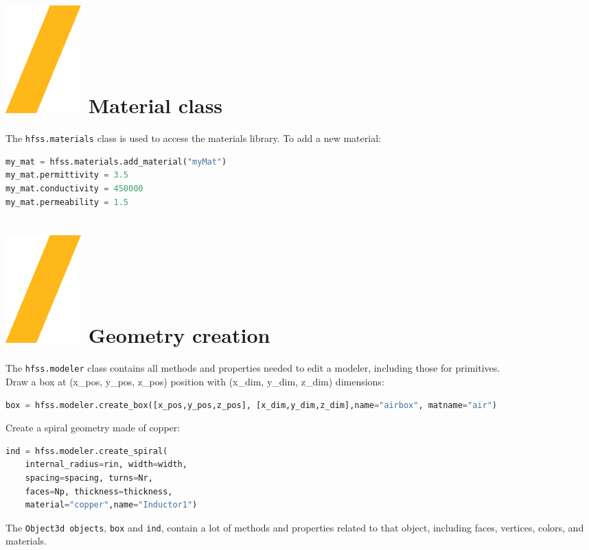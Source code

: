 \documentclass[9pt,landscape]{article}
\begin{document}
\begin{multicols}{3}
\section{\includegraphics[height=\fontcharht\font`\S]{slash.png} Material class}
The \texttt{hfss.materials} class is used to access the materials library. To add a new material: 
\begin{lstlisting}[language=Python]
my_mat = hfss.materials.add_material("myMat")
my_mat.permittivity = 3.5
my_mat.conductivity = 450000
my_mat.permeability = 1.5
\end{lstlisting}

\section{\includegraphics[height=\fontcharht\font`\S]{slash.png} Geometry creation}
The \texttt{hfss.modeler} class contains all methods and properties needed to edit a modeler, including those for primitives.
\newline
\\
Draw a box at (x\_pos, y\_pos, z\_pos) position with (x\_dim, y\_dim, z\_dim) dimensions:
\begin{lstlisting}[language=Python]
box = hfss.modeler.create_box([x_pos,y_pos,z_pos], [x_dim,y_dim,z_dim],name="airbox", matname="air")
\end{lstlisting}
Create a spiral geometry made of copper:
\begin{lstlisting}[language=Python]
ind = hfss.modeler.create_spiral(
	internal_radius=rin, width=width,
	spacing=spacing, turns=Nr,
	faces=Np, thickness=thickness,
	material="copper",name="Inductor1")
\end{lstlisting}
\columnbreak
The \texttt{Object3d objects}, \texttt{box} and \texttt{ind}, contain a lot of methods and properties related to that object, including faces, vertices, colors, and materials.


\end{multicols}
\end{document}
